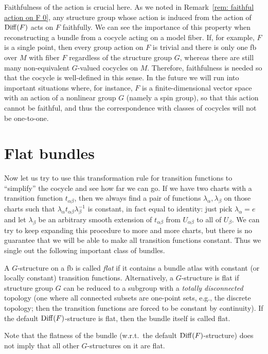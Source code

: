 \begin{rem}\label{rem: faithfulness of action on F}
    Faithfulness of the action is crucial here. As we noted in Remark~\ref{rem: faithful action on F 0}, any structure group whose action is induced from the action of $\operatorname{Diff}(F)$ acts on $F$ faithfully. We can see the importance of this property when reconstructing a bundle from a cocycle acting on a model fiber. If, for example, $F$ is a single point, then every group action on $F$ is trivial and there is only one \gls{fb} over $M$ with fiber $F$ regardless of the structure group $G$, whereas there are still many non-equivalent $G$-valued cocycles on $M$. Therefore, faithfulness is needed so that the cocycle is well-defined in this sense. In the future we will run into important situations where, for instance, $F$ is a finite-dimensional vector space with an action of a nonlinear group $G$ (namely a spin group), so that this action cannot be faithful, and thus the correspondence with classes of cocycles will not be one-to-one.
\end{rem}






\section{Flat bundles}

Now let us try to use this transformation rule for transition functions to ``simplify'' the cocycle and see how far we can go. If we have two charts with a transition function $t_{\alpha\beta}$, then we always find a pair of functions $\lambda_\alpha,\lambda_\beta$ on those charts such that $\lambda_\alpha t_{\alpha\beta}\lambda_\beta^{-1}$ is constant, in fact equal to identity: just pick $\lambda_\alpha=e$ and let $\lambda_\beta$ be an arbitrary smooth extension of $t_{\alpha\beta}$ from $U_{\alpha\beta}$ to all of $U_\beta$. We can try to keep expanding this procedure to more and more charts, but there is no guarantee that we will be able to make all transition functions constant. Thus we single out the following important class of bundles.

\begin{defn}\label{def flat G-bundle}
	A $G$-structure on a \gls{fb} is called \emph{flat} if it contains a bundle atlas with constant (or locally constant) transition functions. Alternatively, a $G$-structure is flat if structure group $G$ can be reduced to a subgroup with a \emph{totally disconnected} topology (one where all connected subsets are one-point sets, e.g., the discrete topology; then the transition functions are forced to be constant by continuity). If the default $\operatorname{Diff}(F)$-structure is flat, then the bundle itself is called flat.
\end{defn}
\begin{rem}
    Note that the flatness of the bundle (w.r.t.\ the default $\operatorname{Diff}(F)$-structure) does not imply that all other $G$-structures on it are flat.
\end{rem}


